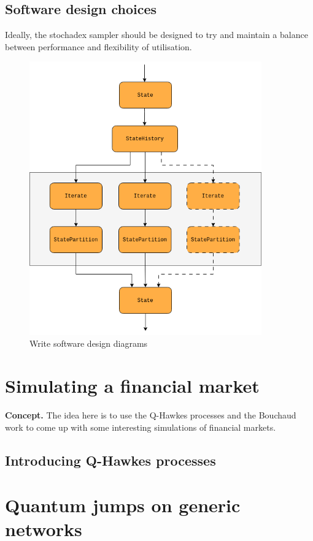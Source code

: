 \documentclass{book}
\begin{document}
\section{\sffamily Software design choices}

Ideally, the stochadex sampler should be designed to try and maintain a balance between performance and flexibility of utilisation.

\begin{figure}[h]
\centering
\includegraphics[width=10cm]{images/stochadex-loop.drawio.png}
\caption{Write software design diagrams}
\label{fig:loop-design}
\end{figure}


\chapter{\sffamily Simulating a financial market}

{\bfseries\sffamily Concept.} The idea here is to use the Q-Hawkes processes and the Bouchaud work to come up with some interesting simulations of financial markets. 

\section{\sffamily Introducing Q-Hawkes processes}


\chapter{\sffamily Quantum jumps on generic networks}
\end{document}

